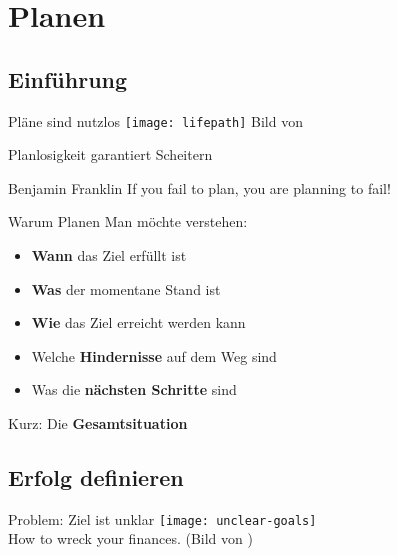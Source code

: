 \section{Planen}


\subsection{Einführung}

\begin{frame}[c]{Pläne sind nutzlos}
    \normalsize
    \texttt{[image: lifepath]}
    Bild von \cite{lifepath-pic}
\end{frame}


\begin{frame}[c]{Planlosigkeit garantiert Scheitern}
    \begin{aquote}{Benjamin Franklin}
        If you fail to plan, you are planning to fail!
    \end{aquote}
\end{frame}

\begin{frame}[c]{Warum Planen}
    \large
    Man möchte verstehen:
    \begin{itemize}[<+(1)->]
        \item \textbf{Wann} das Ziel erfüllt ist
        \item \textbf{Was} der momentane Stand ist
        \item \textbf{Wie} das Ziel erreicht werden kann
        \item Welche \textbf{Hindernisse} auf dem Weg sind
        \item Was die \textbf{nächsten Schritte} sind
    \end{itemize}
    \pause
    Kurz: Die \textbf{Gesamtsituation}
\end{frame}


\subsection{Erfolg definieren}


\begin{frame}[c]{Problem: Ziel ist unklar}
    \normalsize
    \texttt{[image: unclear-goals]} \\
    How to wreck your finances. (Bild von \cite{unclear-goals-pic})
\end{frame}


